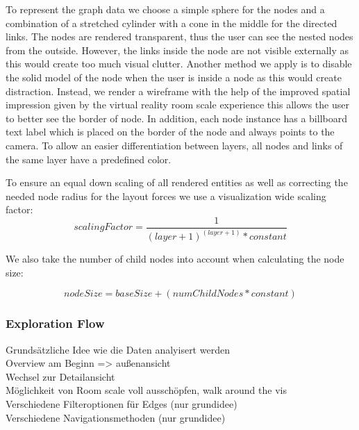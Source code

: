 To represent the graph data we choose a simple sphere for the nodes and a combination of a stretched cylinder with a cone in the middle for the directed links. The nodes are rendered transparent, thus the user can see the nested nodes from the outside. However, the links inside the node are not visible externally as this would create too much visual clutter. 
Another method we apply is to disable the solid model of the node when the user is inside a node as this would create distraction. Instead, we render a wireframe with the help of the improved spatial impression given by the virtual reality room scale experience this allows the user to better see the border of node. 
In addition, each node instance has a billboard text label which is placed on the border of the node and always points to the camera. To allow an easier differentiation between layers, all nodes and links of the same layer have a predefined color.

To ensure an equal down scaling of all rendered entities as well as correcting the needed node radius for the layout forces we use a visualization wide scaling factor:
\begin{equation}
    scalingFactor = \frac{1}{(layer+1)^{(layer+1)} * constant}
\end{equation}

We also take the number of child nodes into account when calculating the node size: 

\begin{equation}
    nodeSize = baseSize + (numChildNodes * constant)
\end{equation}
\subsubsection{Exploration Flow}

Grundsätzliche Idee wie die Daten analyisert werden\\
Overview am Beginn => außenansicht \\
Wechsel zur Detailansicht\\
Möglichkeit von Room scale voll ausschöpfen, walk around the vis\\
Verschiedene Filteroptionen für Edges (nur grundidee)\\
Verschiedene Navigationsmethoden (nur grundidee)\\


